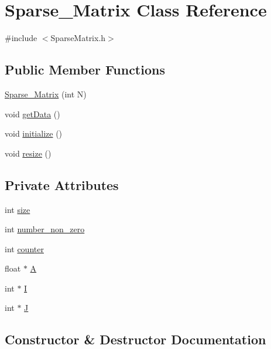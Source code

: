 \hypertarget{class_sparse___matrix}{}\section{Sparse\+\_\+\+Matrix Class Reference}
\label{class_sparse___matrix}


{\ttfamily \#include $<$Sparse\+Matrix.\+h$>$}

\subsection*{Public Member Functions}
\begin{DoxyCompactItemize}
\item 
\hyperlink{class_sparse___matrix_aa3ce6db5b1c26f93f86ffb8884dc85bb}{Sparse\+\_\+\+Matrix} (int N)
\item 
void \hyperlink{class_sparse___matrix_a74953876a03a361211af1f8662a8fbc7}{get\+Data} ()
\item 
void \hyperlink{class_sparse___matrix_a686021f48aea779d990ebb647074464c}{initialize} ()
\item 
void \hyperlink{class_sparse___matrix_af1141a3e469a1ab0e95ea58dfee1f96a}{resize} ()
\end{DoxyCompactItemize}
\subsection*{Private Attributes}
\begin{DoxyCompactItemize}
\item 
int \hyperlink{class_sparse___matrix_a0593a57ade44950748c5c9cb5d9d19d6}{size}
\item 
int \hyperlink{class_sparse___matrix_a279885c2e74db32d7f0e89809041b78e}{number\+\_\+non\+\_\+zero}
\item 
int \hyperlink{class_sparse___matrix_abff04b96a095b67b06635ef50c171456}{counter}
\item 
float $\ast$ \hyperlink{class_sparse___matrix_a46b0a2ca128b883175d8e1f03c03c6cc}{A}
\item 
int $\ast$ \hyperlink{class_sparse___matrix_a00f4239303268686d1370ed2d0e52c8d}{I}
\item 
int $\ast$ \hyperlink{class_sparse___matrix_ab7776df86910c160916338d34b53d461}{J}
\end{DoxyCompactItemize}


\subsection{Constructor \& Destructor Documentation}
\hypertarget{class_sparse___matrix_aa3ce6db5b1c26f93f86ffb8884dc85bb}{}
